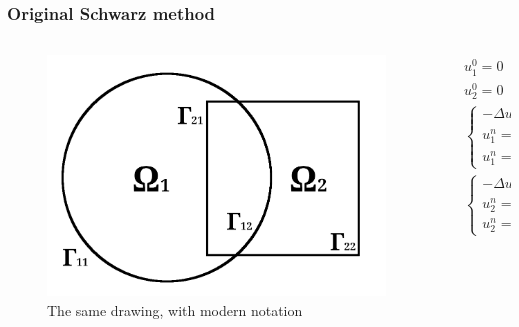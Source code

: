 \documentclass{beamer}
\begin{document}
\begin{frame}
\frametitle{Original Schwarz method}
\begin{columns}
\begin{column}{0.3\textwidth}
	\begin{figure}[h]
		\includegraphics[scale=1.1]{modern-drawing.png}
		\caption*{The same drawing, with modern notation}
	\end{figure}
\end{column}
\begin{column}{0.5\textwidth}
\begin{align*}
&	u_1^0 = 0 \quad \text{in } \overline{\Omega_1} \\
&	u_2^0 = 0 \quad \text{in } \overline{\Omega_2} \\
&	\begin{cases}
		-\Delta u_1^n = f & \text{in $\Omega_1$} \\
		u_1^n = 0 & \text{on $\Gamma_{11}$} \\
		u_1^n = u_2^{n-1} & \text{on $\Gamma_{12}$}
	\end{cases} \\
&	\begin{cases}
		-\Delta u_2^n = f & \text{in $\Omega_2$} \\
		u_2^n = 0 & \text{on $\Gamma_{22}$} \\
		u_2^n = u_1^n & \text{on $\Gamma_{21}$}
	\end{cases}
\end{align*}
\end{column}
\end{columns}
\end{frame}
\end{document}
